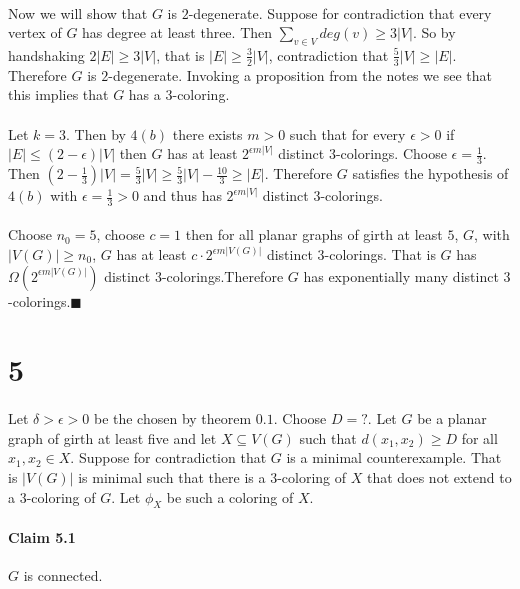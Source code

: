 \documentclass[letterpaper,12pt,oneside,onecolumn]{report}
\begin{document}
\paragraph{}
Now we will show that $G$ is $2$-degenerate. Suppose for contradiction that every vertex of $G$ has degree at least three. Then $\sum_{v\in V} deg(v) \geq 3|V|$. So by handshaking $2|E| \geq 3|V|$, that is $|E| \geq \frac{3}{2}|V|$, contradiction that $\frac{5}{3}|V| \geq |E|$. Therefore $G$ is $2$-degenerate. Invoking a proposition from the notes we see that this implies that $G$ has a $3$-coloring.
\paragraph{}
Let $k = 3$. Then by $4(b)$ there exists $m > 0$ such that for every $\epsilon > 0$ if $|E| \leq (2 - \epsilon)|V|$ then $G$ has at least $2^{\epsilon m |V|}$ distinct $3$-colorings. Choose $\epsilon = \frac{1}{3}$. Then $(2 - \frac{1}{3})|V| = \frac{5}{3}|V| \geq \frac{5}{3}|V| - \frac{10}{3} \geq |E|$. Therefore $G$ satisfies the hypothesis of $4(b)$ with $\epsilon = \frac{1}{3} > 0$ and thus has $2^{\epsilon m |V|}$ distinct $3$-colorings.
\paragraph{}
Choose $n_0 = 5$, choose $c = 1$ then for all planar graphs of girth at least $5$, $G$, with $|V(G)| \geq n_0$, $G$ has at least $c \cdot 2^{\epsilon m |V(G)|}$ distinct $3$-colorings. That is $G$ has $\Omega(2^{\epsilon m |V(G)|})$ distinct $3$-colorings.Therefore $G$ has exponentially many distinct $3$-colorings.$\blacksquare$

\section*{5}
\paragraph{}
Let $\delta > \epsilon > 0$ be the chosen by theorem $0.1$. Choose $D = ?$. Let $G$ be a planar graph of girth at least five and let $X \subseteq V(G)$ such that $d(x_1, x_2) \geq D$ for all $x_1, x_2 \in X$. Suppose for contradiction that $G$ is a minimal counterexample. That is $|V(G)|$ is minimal such that there is a $3$-coloring of $X$ that does not extend to a $3$-coloring of $G$. Let $\phi_X$ be such a coloring of $X$.
\paragraph{Claim 5.1}
$G$ is connected.
\end{document}
